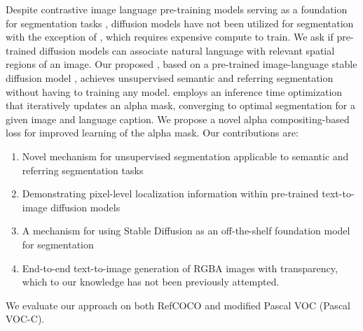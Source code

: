 Despite contrastive image language pre-training models \cite{clip} serving as a foundation for segmentation tasks \cite{Ghiasi2021OpenVocabularyIS, Wang2022CRISCR}, diffusion models \cite{ddpm, pmlr-v37-sohl-dickstein15, scoresde} have not been utilized for segmentation with the exception of \cite{ODISE}, which requires expensive compute to train. We ask if pre-trained diffusion models can associate natural language with relevant spatial regions of an image. Our proposed \modelname, based on a pre-trained image-language stable diffusion model \cite{Rombach2022HighResolutionIS}, achieves unsupervised semantic and referring segmentation without having to training any model.
\modelname employs an inference time optimization that iteratively updates an alpha mask, converging to optimal segmentation for a given image and language caption. We propose a novel alpha compositing-based loss for improved learning of the alpha mask.
Our contributions are:
\begin{enumerate}[topsep=-0.5ex,itemsep=-0.5ex,partopsep=0ex,parsep=1ex]
\item Novel mechanism for unsupervised segmentation applicable to semantic and referring segmentation tasks
\item Demonstrating pixel-level localization information within pre-trained text-to-image diffusion models
\item A mechanism for using Stable Diffusion as an off-the-shelf foundation model for  segmentation
\item End-to-end text-to-image generation of RGBA images with transparency, which to our knowledge has not been previously attempted.
\end{enumerate}

We evaluate our approach on both
RefCOCO \cite{Kazemzadeh2014ReferItGameRT}
 and modified Pascal VOC \cite{everingham2010pascal} (Pascal VOC-C).

